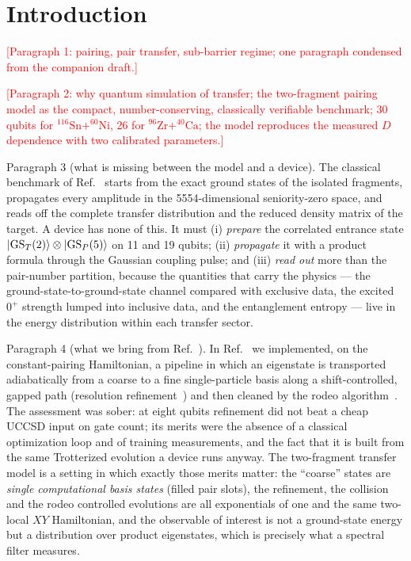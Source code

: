 \documentclass[
  aps,
  prc,
  reprint,
  superscriptaddress,
  floatfix,
  nofootinbib
]{revtex4-2}
\newcommand{\todo}[1]{\textcolor{red}{[#1]}}
\newcommand{\Sn}{^{116}\mathrm{Sn}}
\newcommand{\Ni}{^{60}\mathrm{Ni}}
\newcommand{\Zr}{^{96}\mathrm{Zr}}
\newcommand{\Ca}{^{40}\mathrm{Ca}}
\begin{document}
\maketitle

\section{Introduction}
\todo{Paragraph 1: pairing, pair transfer, sub-barrier regime; one paragraph
condensed from the companion draft.}

\todo{Paragraph 2: why quantum simulation of transfer; the two-fragment
pairing model as the compact, number-conserving, classically verifiable
benchmark; 30 qubits for $\Sn+\Ni$, 26 for $\Zr+\Ca$; the model reproduces
the measured $D$ dependence with two calibrated parameters.}

Paragraph 3 (what is missing between the model and a device).  The
classical benchmark of Ref.~\cite{TwoFragment2026} starts from the exact
ground states of the isolated fragments, propagates every amplitude in the
5554-dimensional seniority-zero space, and reads off the complete transfer
distribution and the reduced density matrix of the target.  A device has
none of this.  It must (i) \emph{prepare} the correlated entrance state
$\ket{\mathrm{GS}_T(2)}\otimes\ket{\mathrm{GS}_P(5)}$ on 11 and 19 qubits;
(ii) \emph{propagate} it with a product formula through the Gaussian
coupling pulse; and (iii) \emph{read out} more than the pair-number
partition, because the quantities that carry the physics --- the
ground-state-to-ground-state channel compared with exclusive data, the
excited $0^+$ strength lumped into inclusive data, and the entanglement
entropy --- live in the energy distribution within each transfer sector.

Paragraph 4 (what we bring from Ref.~\cite{EigenQPairing2026}).  In
Ref.~\cite{EigenQPairing2026} we implemented, on the constant-pairing
Hamiltonian, a pipeline in which an eigenstate is transported adiabatically
from a coarse to a fine single-particle basis along a shift-controlled,
gapped path (resolution refinement~\cite{Bogner2026}) and then cleaned by
the rodeo algorithm~\cite{Choi2021,Qian2024}.  The assessment was sober:
at eight qubits refinement did not beat a cheap UCCSD input on gate count;
its merits were the absence of a classical optimization loop and of
training measurements, and the fact that it is built from the same
Trotterized evolution a device runs anyway.  The two-fragment transfer
model is a setting in which exactly those merits matter: the ``coarse''
states are \emph{single computational basis states} (filled pair slots), the
refinement, the collision and the rodeo controlled evolutions are all
exponentials of one and the same two-local $XY$ Hamiltonian, and the
observable of interest is not a ground-state energy but a distribution over
product eigenstates, which is precisely what a spectral filter measures.
\end{document}
